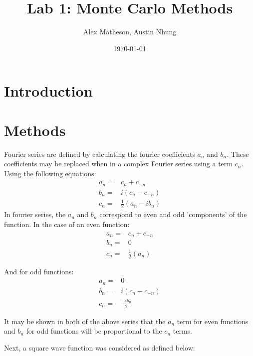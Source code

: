 \documentclass[twocolumn]{article}
\begin{document}
\title{Lab 1: Monte Carlo Methods}
\author{Alex Matheson, Austin Nhung}
\date{\today}
\maketitle

\section{Introduction}

\section{Methods}
Fourier series are defined by calculating the fourier coefficients $a_n$ and $b_n$. These coefficients may be replaced when in a complex Fourier series using a term $c_n$. Using the following equations:
\begin{equation}
\begin{split}
a_n =& c_n + c_{-n} \\
b_n =& i(c_n - c_{-n}) \\
c_n =& \frac{1}{2}(a_n - ib_n)
\end{split}
\end{equation}
In fourier series, the $a_n$ and $b_n$ correspond to even and odd 'components' of the function. In the case of an even function:
\begin{equation}
\begin{split}
a_n =& c_n + c_{-n} \\
b_n =& 0 \\
c_n =& \frac{1}{2}(a_n)
\end{split}
\end{equation}

And for odd functions:
\begin{equation}
\begin{split}
a_n =& 0 \\
b_n =& i(c_n - c_{-n}) \\
c_n =& \frac{-ib_n}{2}
\end{split}
\end{equation} 
 
It may be shown in both of the above series that the $a_n$ term for even functions and $b_n$ for odd functions will be proportional to the $c_n$ terms. 

Next, a square wave function was considered as defined below: 
\end{document}

